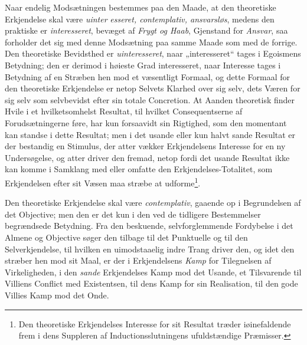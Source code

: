 Naar endelig Modsætningen bestemmes paa den Maade, at den theoretiske
Erkjendelse skal være \emph{uinter}\-%
\setcounter{footnote}{0}%
\emph{esseret, contemplativ, ansvarsløs}, medens den praktiske er
\emph{interesseret}, bevæget af \emph{Frygt og Haab}, Gjenstand for
\emph{Ansvar}, saa forholder det sig med denne Modsætning paa samme Maade som
med de forrige. Den theoretiske Bevidsthed er \emph{uinteresseret}, naar
„interesseret“ tages i Egoismens Betydning; den er derimod i høieste Grad
interesseret, naar Interesse tages i Betydning af en Stræben hen mod et
væsentligt Formaal, og dette Formaal for den theoretiske Erkjendelse er netop
Selvets Klarhed over sig selv, dets Væren for sig selv som selvbevidst efter
sin totale Concretion. At Aanden theoretisk finder Hvile i et hvilketsomhelst
Resultat, til hvilket Consequentserne af Forudsætningerne føre, har kun
forsaavidt sin Rigtighed, som den momentant kan standse i dette Resultat; men
i det usande eller kun halvt sande Resultat er der bestandig en Stimulus, der
atter vækker Erkjendelsens Interesse for en ny Undersøgelse, og atter driver
den fremad, netop fordi det usande Resultat ikke kan komme i Samklang med
eller omfatte den Erkjendelses-Totalitet, som Erkjendelsen efter sit Væsen maa
stræbe at udforme\footnote{Den theoretiske Erkjendelses Interesse for sit
Resultat træder iøinefaldende frem i dens Suppleren af Inductionsslutningens
ufuldstændige Præmisser.}.

Den theoretiske Erkjendelse skal være \emph{contemplativ}, gaaende op i
Begrundelsen af det Objective; men den er det kun i den ved de tidligere
Bestemmelser begrændsede Betydning. Fra den beskuende, selvforglemmende
Fordybelse i det Almene og Objective søger den tilbage til det Punktuelle og
til den Selverkjendelse, til hvilken en uimodstaaelig indre Trang driver den,
og idet den stræber hen mod sit Maal, er der i Erkjendelsens \emph{Kamp} for
Tilegnelsen af Virkeligheden, i den \emph{sande} Erkjendelses Kamp mod det
Usande, et Tilsvarende til Villiens Conflict med Existentsen, til dens Kamp
for sin Realisation, til den gode Villies Kamp mod det Onde.

